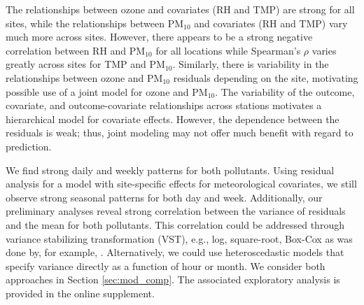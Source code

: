 \documentclass[alpha-refs]{wiley-article}
\begin{document}
The relationships between ozone and covariates (RH and TMP) are strong for all sites, while the relationships between $\text{PM}_{10}$ and covariates (RH and TMP) vary much more across sites.  However, there appears to be a strong negative correlation between RH and $\text{PM}_{10}$ for all locations while Spearman's $\rho$ varies greatly across sites for TMP and $\text{PM}_{10}$. Similarly, there is variability in the relationships between ozone and $\text{PM}_{10}$ residuals depending on the site, motivating possible use of a joint model for ozone and $\text{PM}_{10}$. The variability of the outcome, covariate, and outcome-covariate relationships across stations motivates a hierarchical model for covariate effects.  However, the dependence between the residuals is weak; thus, joint modeling may not offer much benefit with regard to prediction.  %

We find strong daily and weekly patterns for both pollutants. Using residual analysis for a model with site-specific effects for meteorological covariates, we still observe strong seasonal patterns for both day and week. Additionally, our preliminary analyses reveal strong correlation between the variance of residuals and the mean for both pollutants. This correlation could be addressed through variance stabilizing transformation (VST), e.g., log, square-root, Box-Cox as was done by, for example, \citet{sahu2007,cocchi2007,berrocal2010,huang2018}. Alternatively, we could use heteroscedastic models that specify variance directly as a function of hour or month. We consider both approaches in Section \ref{sec:mod_comp}. The associated exploratory analysis is provided in the online supplement.
\end{document}
